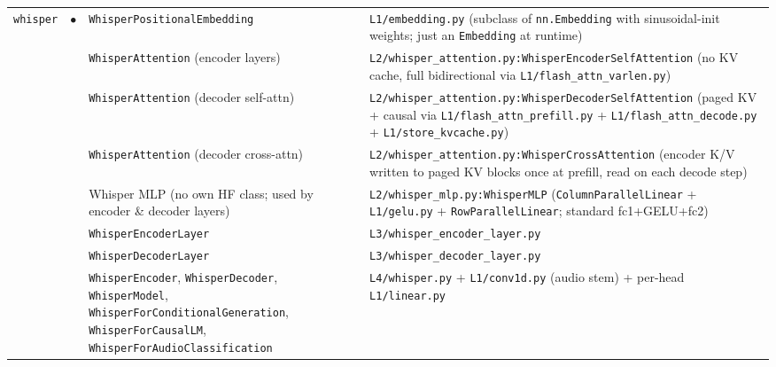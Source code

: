 \documentclass[10pt]{article}
\begin{document}
{\begin{longtable}{@{}p{1.6cm} c p{4.0cm} p{14.5cm}@{}}
\multirow{8}{*}{\texttt{whisper}} & \multirow{8}{*}{$\bullet$}
   & \texttt{WhisperPositionalEmbedding} & \texttt{L1/embedding.py} (subclass of \texttt{nn.Embedding} with sinusoidal-init weights; just an \texttt{Embedding} at runtime) \\
&& \texttt{WhisperAttention} (encoder layers) & \texttt{L2/whisper\_attention.py:WhisperEncoderSelfAttention} (no KV cache, full bidirectional via \texttt{L1/flash\_attn\_varlen.py}) \\
&& \texttt{WhisperAttention} (decoder self-attn) & \texttt{L2/whisper\_attention.py:WhisperDecoderSelfAttention} (paged KV + causal via \texttt{L1/flash\_attn\_prefill.py} + \texttt{L1/flash\_attn\_decode.py} + \texttt{L1/store\_kvcache.py}) \\
&& \texttt{WhisperAttention} (decoder cross-attn) & \texttt{L2/whisper\_attention.py:WhisperCrossAttention} (encoder K/V written to paged KV blocks once at prefill, read on each decode step) \\
&& Whisper MLP (no own HF class; used by encoder \& decoder layers) & \texttt{L2/whisper\_mlp.py:WhisperMLP} (\texttt{ColumnParallelLinear} + \texttt{L1/gelu.py} + \texttt{RowParallelLinear}; standard fc1+GELU+fc2) \\
&& \texttt{WhisperEncoderLayer}          & \texttt{L3/whisper\_encoder\_layer.py} \\
&& \texttt{WhisperDecoderLayer}          & \texttt{L3/whisper\_decoder\_layer.py} \\
&& \texttt{WhisperEncoder}, \texttt{WhisperDecoder}, \texttt{WhisperModel}, \texttt{WhisperForConditionalGeneration}, \texttt{WhisperForCausalLM}, \texttt{WhisperForAudioClassification} & \texttt{L4/whisper.py} + \texttt{L1/conv1d.py} (audio stem) + per-head \texttt{L1/linear.py} \\
\midrule


\end{longtable}}
\end{document}
